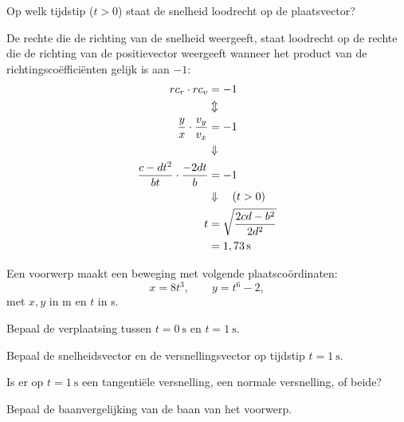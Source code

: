 \documentclass{ximera}
\begin{document}
\begin{exercise}
	\begin{question}
	Op welk tijdstip ($t>0$) staat de snelheid loodrecht op de plaatsvector?
	
	\begin{oplossing}
	De rechte die de richting van de snelheid weergeeft, staat loodrecht op de rechte die de richting van de positievector weergeeft wanneer het product van de richtingsco\"effici\"enten gelijk is aan $-1$:
	\begin{align*}
	rc_{r}\cdot rc_{v}&=-1\\
	&\Updownarrow\\
	\frac{y}{x}\cdot\frac{v_y}{v_x}&=-1\\
	&\Downarrow\\
	\frac{c-dt^2}{bt}\cdot\frac{-2dt}{b}&=-1\\
	&\Downarrow \quad (t>0)\\
	t&=\sqrt{\frac{2cd-b^2}{2d^2}}\\
	&=1,73\rm\,s
	\end{align*}
	\end{oplossing}
	\end{question}
	
\end{exercise}
	


\begin{exercise}
	Een voorwerp maakt een beweging met volgende plaatscoördinaten:
	\[
	x=8t^{3},\qquad y=t^{6}-2,
	\]
	met \(x,y\) in \si{\meter} en \(t\) in \si{\second}.
	
	\begin{question}
	Bepaal de verplaatsing tussen \(t=\SI{0}{\second}\) en \(t=\SI{1}{\second}\).
	\end{question}
	
	\begin{question}
	Bepaal de snelheidsvector en de versnellingsvector op tijdstip \(t=\SI{1}{\second}\).
	\end{question}
	
	\begin{question}
	Is er op \(t=\SI{1}{\second}\) een tangentiële versnelling, een normale versnelling, of beide?%
	\end{question}
	
	\begin{question}
		Bepaal de baanvergelijking van de baan van het voorwerp.
	\end{question}
	
\end{exercise}
\end{document}
